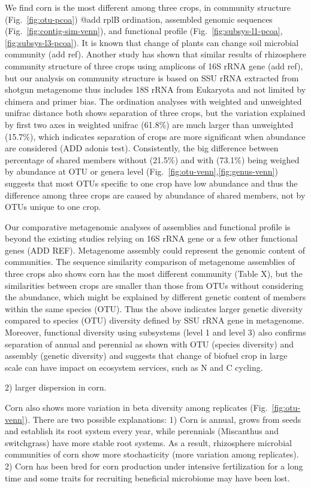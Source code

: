 \documentclass[12pt]{article}
\begin{document}
We find corn is the most different among three crops, in community structure (Fig.~\ref{fig:otu-pcoa}) @add rplB ordination, assembled genomic sequences (Fig.~\ref{fig:contig-sim-venn}), and functional profile (Fig.~\ref{fig:subsys-l1-pcoa},\ref{fig:subsys-l3-pcoa}). It is known that change of plants can change soil microbial community (add ref). Another study has shown that similar results of rhizosphere community structure of three crops using amplicons of 16S rRNA gene (add ref), but our analysis on community structure is based on SSU rRNA extracted from shotgun metagenome thus includes 18S rRNA from Eukaryota and not limited by chimera and primer bias. The ordination analyses with weighted and unweighted unifrac distance both shows separation of three crops, but the variation explained by first two axes in weighted unifrac (61.8\%) are much larger than unweighted (15.7\%), which indicates separation of crops are more significant when abundance are considered (ADD adonis test). Consistently, the big difference between percentage of shared members without (21.5\%) and with (73.1\%) being weighed by abundance at OTU or genera level (Fig.~\ref{fig:otu-venn},\ref{fig:genus-venn}) suggests that most OTUs specific to one crop have low abundance and thus the difference among three crops are caused by abundance of shared members, not by OTUs unique to one crop. 

Our comparative metagenomic analyses of assemblies and functional profile is beyond the existing studies relying on 16S rRNA gene or a few other functional genes (ADD REF). Metagenome assembly could represent the genomic content of communities. The sequence similarity comparison of metagenome assemblies of three crops also shows corn has the most different community (Table X), but the similarities between crops are smaller than those from OTUs without considering the abundance, which might be explained by different genetic content of members within the same species (OTU). Thus the above indicates larger genetic diversity compared to species (OTU) diversity defined by SSU rRNA gene in metagenome. Moreover, functional diversity using subsystems (level 1 and level 3) also confirms separation of annual and perennial as shown with OTU (species diversity) and assembly (genetic diversity) and suggests that change of biofuel crop in large scale can have impact on ecosystem services, such as N and C cycling.

2) larger dispersion in corn.

Corn also shows more variation in beta diversity among replicates (Fig.~\ref{fig:otu-venn}). There are two possible explanations: 1) Corn is annual, grows from seeds and establish its root system every year, while perennials (Miscanthus and switchgrass) have more stable root systems. As a result, rhizosphere microbial communities of corn show more stochasticity (more variation among replicates). 2) Corn has been bred for corn production under intensive fertilization for a long time and some traits for recruiting beneficial microbiome may have been lost.
\end{document}
